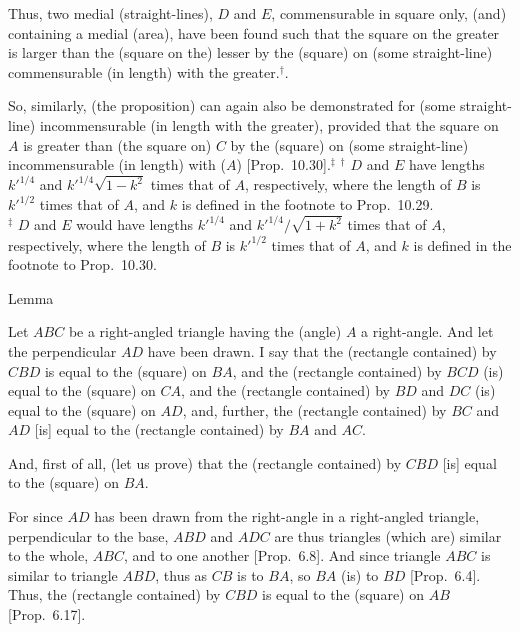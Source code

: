 Thus, two medial (straight-lines), $D$ and $E$, commensurable in square only, (and) containing a medial (area), have been found such that
the square on the greater is larger than the (square on the) lesser by the
(square) on (some straight-line) commensurable (in length) with the greater.$^\dag$.

So, similarly, (the proposition) can again also be demonstrated for
(some straight-line) incommensurable (in length with the greater), provided that
the square on $A$ is greater than (the square on) $C$ by the (square)
on (some straight-line) incommensurable (in length) with ($A$) [Prop.~10.30].$^\ddag$
{\footnotesize\noindent $^\dag$ $D$ and $E$ have lengths $k'^{1/4}$ and $k'^{1/4}\sqrt{1-k^2}$ times that of $A$, respectively, where the length of $B$ is $k'^{1/2}$ times that of $A$, and $k$ is defined in the footnote to
Prop.~10.29.\\[0.5ex]
$^\ddag$ $D$ and $E$ would have lengths $k'^{1/4}$ and $k'^{1/4}/\sqrt{1+k^2}$ times that of $A$, respectively, where the length of $B$ is $k'^{1/2}$ times that of $A$, and $k$ is defined in the footnote to
Prop.~10.30.}


\begin{center}
{\large Lemma}
\end{center}

Let $ABC$ be a right-angled triangle having
the (angle) $A$ a right-angle. And let the perpendicular $AD$ have been
drawn. I say that the (rectangle contained) by $CBD$ is equal to the
(square) on $BA$, and the (rectangle contained) by $BCD$ (is)
equal to the (square) on $CA$, and the (rectangle contained) by
$BD$ and $DC$ (is) equal to the (square) on $AD$, and, further, the
(rectangle contained) by $BC$ and $AD$ [is] equal to the (rectangle
contained) by $BA$ and $AC$.

And, first of all, (let us prove) that the (rectangle contained) by
$CBD$ [is] equal to the (square) on $BA$.

\epsfysize=2in
\centerline{}

For since $AD$ has been drawn from the right-angle  in a right-angled triangle,
perpendicular to the base, $ABD$ and $ADC$ are thus
triangles (which are) similar to the whole, $ABC$, and to one another
[Prop.~6.8]. And since triangle $ABC$ is
similar to triangle $ABD$, thus as $CB$ is to $BA$, so $BA$ (is)
to $BD$ [Prop.~6.4]. Thus, the
(rectangle contained) by $CBD$ is equal to the (square) on $AB$
[Prop.~6.17].

